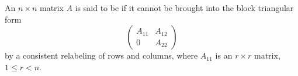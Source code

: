 An $n \times n$ matrix $A$ is said to be  if it cannot be brought into the block triangular form
$$\begin{pmatrix} A_{11} & A_{12} \\ 0 & A_{22} \end{pmatrix}$$
by a consistent relabeling of rows and columns, where $A_{11}$ is an $r \times r$ matrix, $1 \leq r < n$.
